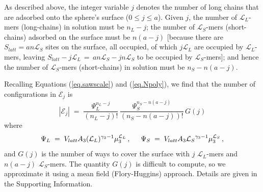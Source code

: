 \documentclass[journal=mamobx,manuscript=article]{achemso}
\newcommand{\leng}{\mathcal{L}}
\begin{document}
 As described above, the integer variable $j$ 
 denotes the number of long chains that are adsorbed
 onto the sphere's surface ($0\leq j\leq a$).
 Given $j$, the number of $\leng_L$-mers (long-chains) in solution must be $n_L-j$; 
 the number of $\leng_S$-mers (short-chains) adsorbed on the surface must be $n(a-j)$ [because there are $S_{latt}=an\leng_S$ sites on the surface, all occupied, of which $j\leng_L$ are occupied by $\leng_L$-mers, leaving $S_{latt}-j\leng_L\,=\, an\leng_S-jn\leng_S$ to be  occupied by $\leng_S$-mers]; 
 and hence the number of $\leng_S$-mers (short-chains) in solution must be  $n_S-n(a-j)$.

Recalling Equations (\ref{eq.sawscale}) and 
(\ref{eq.Npoly}), we find that the number of configurations in $\mathcal{E}_j$ is
\begin{equation}
    |\mathcal{E}_j|  
      \; = \; \frac{ \Psi_L^{n_L-j} }{(n_L-j)!} \,
          \frac{ \Psi_S^{n_S-n(a-j)} }{(n_S-n(a-j))!} \,  G(j)
        \label{eq.Yj}
\end{equation}
where 
\begin{equation}
    \label{eq.psidef}   
   \Psi_L\;=\;V_{latt} A_3 (\leng_L)^{\gamma_3-1} \mu_{3}^{\leng_L} \,,  
    \hspace{5mm} %
     \Psi_S \;=\; V_{latt}A_3{\leng_S}^{\gamma_3-1}\mu_3^{\leng_S} \,,
\end{equation}
and $G(j)$ is the number of ways to cover the surface
with $j$ $\leng_L$-mers and $n(a-j)$ $\leng_S$-mers.
The quantity $G(j)$ is difficult to compute, so we
approximate it using a mean field (Flory-Huggins) approach.  Details are given in the Supporting Information.
\end{document}
